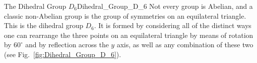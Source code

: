     \begin{lexample}{The Dihedral Group $D_{6}$}{Dihedral_Group_D_6}
        Not every group is Abelian, and a classic non-Abelian group is the group
        of symmetries on an equilateral triangle. This is the dihedral group
        $D_{6}$. It is formed by considering all of the distinct ways one can
        rearrange the three points on an equilateral triangle by means of
        rotation by $60^{\circ}$ and by reflection across the $y$ axis, as well
        as any combination of these two (see Fig.~\ref{fig:Dihedral_Group_D_6}).
        \begin{figure}[H]
            \centering
            \captionsetup{type=figure}
\end{figure}
\end{lexample}
